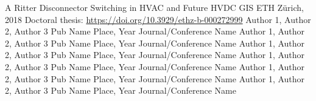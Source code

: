 \begin{cventries}
\wtfRef
    {A Ritter}
    {Disconnector Switching in HVAC and Future HVDC GIS}
    {}
    {ETH Zürich, 2018}
    {Doctoral thesis: \url{https://doi.org/10.3929/ethz-b-000272999}}
    \wtfRef
    {Author 1, Author 2, Author 3}
    {Pub Name}
    {}
    {Place, Year}
    {Journal/Conference Name}
    \wtfRef
    {Author 1, Author 2, Author 3}
    {Pub Name}
    {}
    {Place, Year}
    {Journal/Conference Name}    
    \wtfRef
    {Author 1, Author 2, Author 3}
    {Pub Name}
    {}
    {Place, Year}
    {Journal/Conference Name}    
    \wtfRef
    {Author 1, Author 2, Author 3}
    {Pub Name}
    {}
    {Place, Year}
    {Journal/Conference Name}    
    \wtfRef
    {Author 1, Author 2, Author 3}
    {Pub Name}
    {}
    {Place, Year}
    {Journal/Conference Name}    
    \wtfRef
    {Author 1, Author 2, Author 3}
    {Pub Name}
    {}
    {Place, Year}
    {Journal/Conference Name}
\end{cventries}